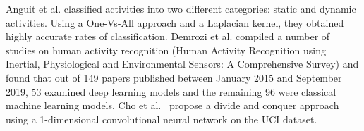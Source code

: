Anguit et al. \cite{Anguita2012}  classified activities into two different categories:  static and dynamic activities.
Using a One-Vs-All approach and a Laplacian kernel, they obtained highly accurate rates of classification.
Demrozi et al. \cite{Demrozi2020} compiled a number of studies on human activity recognition (Human Activity Recognition using Inertial, Physiological and Environmental Sensors: A Comprehensive Survey) and found that out of 149 papers published between January 2015 and September 2019, 53 examined deep learning models and the remaining 96 were classical machine learning models.
Cho et al.~\cite{Cho2018} propose a divide and conquer approach using a 1-dimensional convolutional neural network on the UCI dataset.